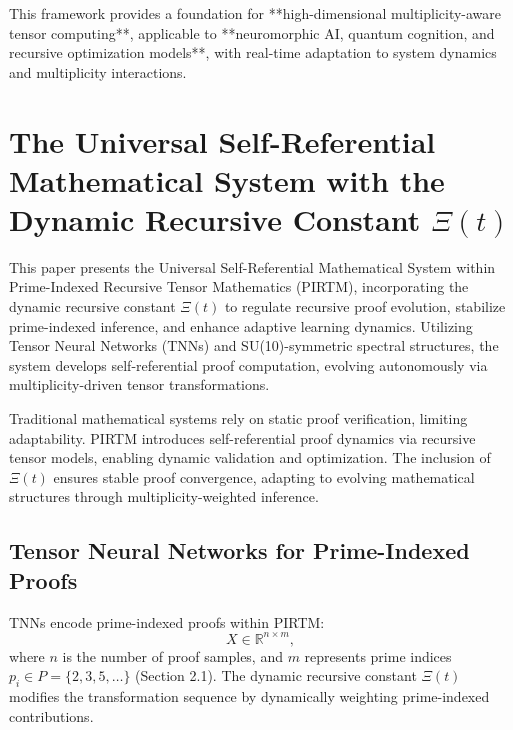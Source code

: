 \documentclass{article}
\theoremstyle{plain}
\begin{document}
\begin{itemize}
This framework provides a foundation for **high-dimensional multiplicity-aware tensor computing**, applicable to **neuromorphic AI, quantum cognition, and recursive optimization models**, with real-time adaptation to system dynamics and multiplicity interactions.


\section{The Universal Self-Referential Mathematical System with the Dynamic Recursive Constant \(\Xi(t) \)}

This paper presents the Universal Self-Referential Mathematical System within Prime-Indexed Recursive Tensor Mathematics (PIRTM), incorporating the dynamic recursive constant \(\Xi(t) \) to regulate recursive proof evolution, stabilize prime-indexed inference, and enhance adaptive learning dynamics. Utilizing Tensor Neural Networks (TNNs) and SU(10)-symmetric spectral structures, the system develops self-referential proof computation, evolving autonomously via multiplicity-driven tensor transformations.

Traditional mathematical systems rely on static proof verification, limiting adaptability. PIRTM introduces self-referential proof dynamics via recursive tensor models, enabling dynamic validation and optimization. The inclusion of \(\Xi(t) \) ensures stable proof convergence, adapting to evolving mathematical structures through multiplicity-weighted inference.

\subsection{Tensor Neural Networks for Prime-Indexed Proofs}
TNNs encode prime-indexed proofs within PIRTM:
\begin{equation}
X \in \mathbb{R}^{n \times m},
\end{equation}
where \( n \) is the number of proof samples, and \( m \) represents prime indices \( p_i \in P = \{2, 3, 5, \dots\} \) (Section 2.1). The dynamic recursive constant \(\Xi(t) \) modifies the transformation sequence by dynamically weighting prime-indexed contributions.


\end{itemize}
\end{document}
